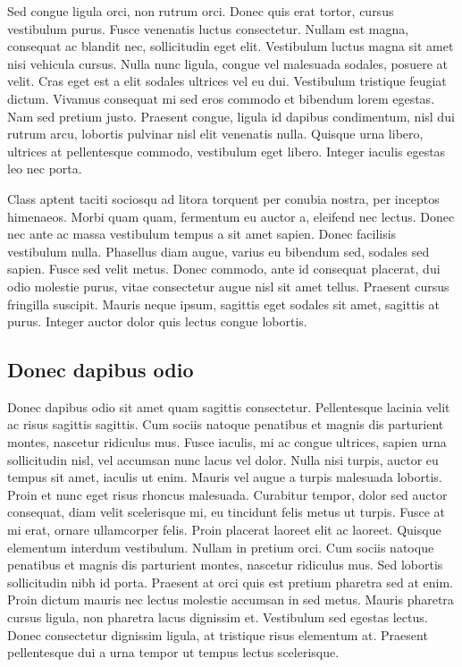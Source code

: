 Sed congue ligula orci, non rutrum orci.
Donec quis erat tortor, cursus vestibulum purus.
Fusce venenatis luctus consectetur.
Nullam est magna, consequat ac blandit nec, sollicitudin eget elit.
Vestibulum luctus magna sit amet nisi vehicula cursus.
Nulla nunc ligula, congue vel malesuada sodales, posuere at velit.
Cras eget est a elit sodales ultrices vel eu dui.
Vestibulum tristique feugiat dictum.
Vivamus consequat mi sed eros commodo et bibendum lorem egestas.
Nam sed pretium justo.
Praesent congue, ligula id dapibus condimentum, nisl dui rutrum arcu, lobortis pulvinar nisl elit venenatis nulla.
Quisque urna libero, ultrices at pellentesque commodo, vestibulum eget libero.
Integer iaculis egestas leo nec porta.

Class aptent taciti sociosqu ad litora torquent per conubia nostra, per inceptos himenaeos.
Morbi quam quam, fermentum eu auctor a, eleifend nec lectus.
Donec nec ante ac massa vestibulum tempus a sit amet sapien.
Donec facilisis vestibulum nulla.
Phasellus diam augue, varius eu bibendum sed, sodales sed sapien.
Fusce sed velit metus.
Donec commodo, ante id consequat placerat, dui odio molestie purus, vitae consectetur augue nisl sit amet tellus.
Praesent cursus fringilla suscipit.
Mauris neque ipsum, sagittis eget sodales sit amet, sagittis at purus.
Integer auctor dolor quis lectus congue lobortis.

\subsection{Donec dapibus odio}
Donec dapibus odio sit amet quam sagittis consectetur.
Pellentesque lacinia velit ac risus sagittis sagittis.
Cum sociis natoque penatibus et magnis dis parturient montes, nascetur ridiculus mus.
Fusce iaculis, mi ac congue ultrices, sapien urna sollicitudin nisl, vel accumsan nunc lacus vel dolor.
Nulla nisi turpis, auctor eu tempus sit amet, iaculis ut enim.
Mauris vel augue a turpis malesuada lobortis.
Proin et nunc eget risus rhoncus malesuada.
Curabitur tempor, dolor sed auctor consequat, diam velit scelerisque mi, eu tincidunt felis metus ut turpis.
Fusce at mi erat, ornare ullamcorper felis.
Proin placerat laoreet elit ac laoreet.
Quisque elementum interdum vestibulum.
Nullam in pretium orci.
Cum sociis natoque penatibus et magnis dis parturient montes, nascetur ridiculus mus.
Sed lobortis sollicitudin nibh id porta.
Praesent at orci quis est pretium pharetra sed at enim.
Proin dictum mauris nec lectus molestie accumsan in sed metus.
Mauris pharetra cursus ligula, non pharetra lacus dignissim et.
Vestibulum sed egestas lectus.
Donec consectetur dignissim ligula, at tristique risus elementum at.
Praesent pellentesque dui a urna tempor ut tempus lectus scelerisque.

